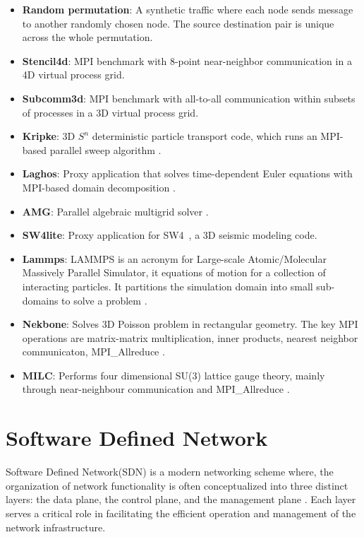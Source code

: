 \begin{itemize}
\item \textbf{Random permutation}: A synthetic traffic where each node sends message to another randomly chosen node. The source destination pair is unique across the whole permutation.
\item \textbf{Stencil4d}: MPI benchmark with 8-point near-neighbor communication in a 4D virtual process grid.
\item \textbf{Subcomm3d}: MPI benchmark with all-to-all communication within subsets of processes in a 3D virtual process grid.
\item \textbf{Kripke}: 3D $S^n$ deterministic particle transport code, which runs an MPI-based parallel sweep algorithm \cite{kripke}. 
\item \textbf{Laghos}: Proxy application that solves time-dependent Euler equations with MPI-based domain decomposition \cite{laghos}.
\item \textbf{AMG}:  Parallel algebraic multigrid solver \cite{amg}.
\item \textbf{SW4lite}: Proxy application for SW4~\cite{sjogreen2018sw4}, a 3D seismic modeling code.
\item \textbf{Lammps}: LAMMPS is an acronym for Large-scale Atomic/Molecular Massively Parallel Simulator, it equations of motion for a collection of interacting particles. It partitions the simulation domain into small sub-domains to solve a problem \cite{thompson2022lammps}.
\item \textbf{Nekbone}: Solves 3D Poisson problem in rectangular geometry. The key MPI operations are matrix-matrix multiplication, inner products, nearest neighbor communicaton, MPI\_Allreduce \cite{gong2016nekbone}.
\item \textbf{MILC}: Performs four dimensional SU(3) lattice gauge theory, mainly through near-neighbour communication and MPI\_Allreduce \cite{gottlieb2001benchmarking}.
\end{itemize}

\section{Software Defined Network}
Software Defined Network(SDN) is a modern networking scheme where, the organization of network functionality is often conceptualized into three distinct layers: the data plane, the control plane, and the management plane \cite{kreutz2014software}. Each layer serves a critical role in facilitating the efficient operation and management of the network infrastructure.

